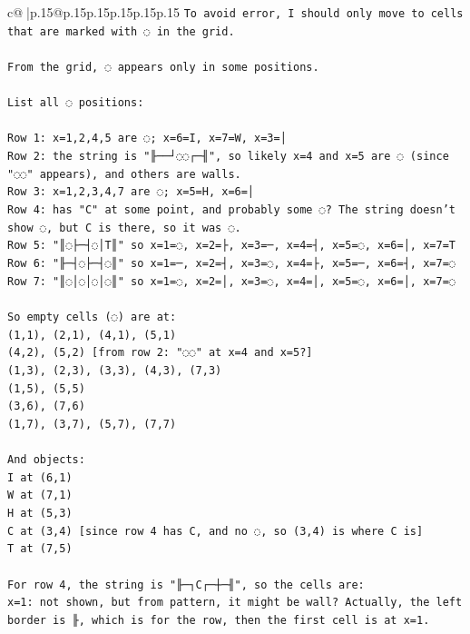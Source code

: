 \documentclass{article}
\begin{document}
{\begin{supertabular}{c@{$\;$}|p{.15\linewidth}@{}p{.15\linewidth}p{.15\linewidth}p{.15\linewidth}p{.15\linewidth}p{.15\linewidth}}
{{{\texttt{To avoid error, I should only move to cells that are marked with ◌ in the grid.} \\
\\ 
\texttt{From the grid, ◌ appears only in some positions.} \\
\\ 
\texttt{List all ◌ positions:} \\
\\ 
\texttt{Row 1: x=1,2,4,5 are ◌; x=6=I, x=7=W, x=3=│} \\
\texttt{Row 2: the string is "╟──┘◌◌┌─╢", so likely x=4 and x=5 are ◌ (since "◌◌" appears), and others are walls.} \\
\texttt{Row 3: x=1,2,3,4,7 are ◌; x=5=H, x=6=│} \\
\texttt{Row 4: has "C" at some point, and probably some ◌? The string doesn't show ◌, but C is there, so it was ◌.} \\
\texttt{Row 5: "║◌├─┤◌│T║" so x=1=◌, x=2=├, x=3=─, x=4=┤, x=5=◌, x=6=│, x=7=T} \\
\texttt{Row 6: "╟─┤◌├─┤◌║" so x=1=─, x=2=┤, x=3=◌, x=4=├, x=5=─, x=6=┤, x=7=◌} \\
\texttt{Row 7: "║◌│◌│◌│◌║" so x=1=◌, x=2=│, x=3=◌, x=4=│, x=5=◌, x=6=│, x=7=◌} \\
\\ 
\texttt{So empty cells (◌) are at:} \\
\texttt{(1,1), (2,1), (4,1), (5,1)} \\
\texttt{(4,2), (5,2)  {[}from row 2: "◌◌" at x=4 and x=5?{]}} \\
\texttt{(1,3), (2,3), (3,3), (4,3), (7,3)} \\
\texttt{(1,5), (5,5)} \\
\texttt{(3,6), (7,6)} \\
\texttt{(1,7), (3,7), (5,7), (7,7)} \\
\\ 
\texttt{And objects:} \\
\texttt{I at (6,1)} \\
\texttt{W at (7,1)} \\
\texttt{H at (5,3)} \\
\texttt{C at (3,4)  {[}since row 4 has C, and no ◌, so (3,4) is where C is{]}} \\
\texttt{T at (7,5)} \\
\\ 
\texttt{For row 4, the string is "╟─┐C┌─┼─╢", so the cells are:} \\
\texttt{x=1: not shown, but from pattern, it might be wall? Actually, the left border is ╟, which is for the row, then the first cell is at x=1.} \\
}}}
\end{supertabular}}
\end{document}
